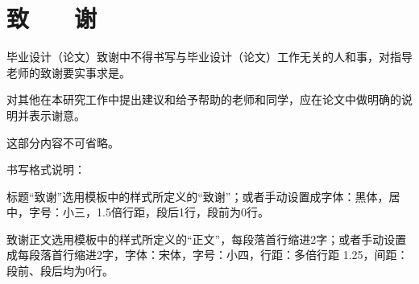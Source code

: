
\chapter*{\hfill 致　　谢 \hfill}
\linespread{1.25}
\sloppy{}

毕业设计（论文）致谢中不得书写与毕业设计（论文）工作无关的人和事，对指导老师的致谢要实事求是。

对其他在本研究工作中提出建议和给予帮助的老师和同学，应在论文中做明确的说明并表示谢意。

这部分内容不可省略。

书写格式说明：

标题“致谢”选用模板中的样式所定义的“致谢”；或者手动设置成字体：黑体，居中，字号：小三，1.5倍行距，段后1行，段前为0行。

致谢正文选用模板中的样式所定义的“正文”，每段落首行缩进2字；或者手动设置成每段落首行缩进2字，字体：宋体，字号：小四，行距：多倍行距 1.25，间距：段前、段后均为0行。